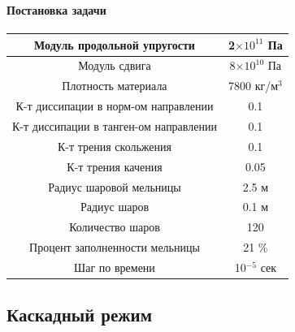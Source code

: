 \documentclass[c]{beamer}  %
\begin{document}
\begin{frame}
\frametitle{\insertsection} 
\framesubtitle{Постановка задачи}

\begin{center}
\begin{tabular}{|c|c|}
\hline
Модуль продольной упругости & 2$\times 10^{11}$ Па  \\ 
\hline
Модуль сдвига & 8$\times 10^{10}$ Па \\  
\hline
Плотность материала & 7800 кг/м$^3$ \\
\hline
К-т диссипации в норм-ом направлении & 0.1 \\
\hline
К-т диссипации в танген-ом направлении & 0.1 \\
\hline
К-т трения скольжения & 0.1 \\
\hline
К-т трения качения & 0.05 \\
\hline
Радиус шаровой мельницы & 2.5 м \\
\hline
Радиус шаров & 0.1 м \\
\hline
Количество шаров & 120 \\
\hline
Процент заполненности мельницы & 21 \% \\
\hline
Шаг по времени & 10$^{-5}$ сек \\
\hline
\end{tabular}
\end{center}

\end{frame}

\subsection{Каскадный режим}
\end{document}

